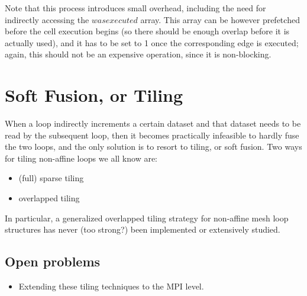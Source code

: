 \documentclass[a4paper]{article}
\begin{document}
Note that this process introduces small overhead, including the need for indirectly accessing the $wasexecuted$ array. This array can be however prefetched before the cell execution begins (so there should be enough overlap before it is actually used), and it has to be set to 1 once the corresponding edge is executed; again, this should not be an expensive operation, since it is non-blocking.

\section{Soft Fusion, or Tiling}
When a loop indirectly increments a certain dataset and that dataset needs to be read by the subsequent loop, then it becomes practically infeasible to hardly fuse the two loops, and the only solution is to resort to tiling, or soft fusion. Two ways for tiling non-affine loops we all know are:
\begin{itemize}
\item (full) sparse tiling
\item overlapped tiling
\end{itemize}
In particular, a generalized overlapped tiling strategy for non-affine mesh loop structures has never (too strong?) been implemented or extensively studied.
\subsection{Open problems}
\begin{itemize}
\item Extending these tiling techniques to the MPI level.
\end{itemize}

\clearpage
\end{document}

